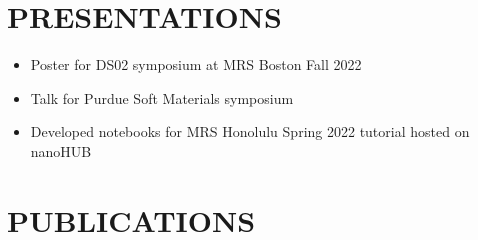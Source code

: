 \chapter{PRESENTATIONS}
\label{sec:orgcd78d4b}
\begin{itemize}
\item Poster for DS02 symposium at MRS Boston Fall 2022
\autocite{2022-novel-halid}
\item Talk for Purdue Soft Materials symposium
\autocite{2022-machin-learn}
\item Developed notebooks
\autocite{manganaris-2022-mrs-comput}
for MRS Honolulu Spring 2022 tutorial hosted on nanoHUB
\autocite{2022-ds00-tutor}
\end{itemize}

\chapter{PUBLICATIONS}
\label{sec:org052c030}

\nocite{manganaris-2022-mrs-comput}
\nocite{yang-2023-high-throug}
\nocite{manganaris-2023-multi-fidel}
\nocite{gollapalli-2023-graph-neural}
\nocite{edlabadkar-2023-drivin-halid}
\nocite{yang-2023-discov-novel}

\makeatletter
{}
  {\list
     {}
     {\setlength{\bibhang}{1in} %
      \setlength{\itemindent}{1in}%
      \setlength{\itemsep}{\bibitemsep}%
      \setlength{\leftmargin}{0pt}%
      \setlength{\parsep}{\bibparsep}%
      \setlength{\rightmargin}{0.33in}%
      }%
      \renewcommand*{\makelabel}[1]{\hss##1}}
  {\endlist}
  {\item}
\makeatother

\printbibliography[heading=none,category=myarticles]
